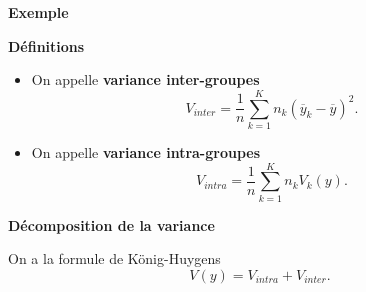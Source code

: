\documentclass[aspectratio=169,xcolor=dvipsnames]{beamer}
\begin{document}
\begin{frame}
\begin{exampleblock}{\textbf{Exemple}}
\begin{figure}
\begin{subfigure}{0.3\textwidth}
		\end{subfigure}
		\end{figure}
	\end{exampleblock}
\end{frame}

\begin{frame}
	
	\begin{block}{\textbf{Définitions}}
\begin{small}
		\begin{itemize}
		\item On appelle \textbf{variance inter-groupes}
			\[
			V_{inter} = \dfrac{1}{n} \sum_{k=1}^K n_k \left( \overline{y}_k - \overline{y}\right)^2.
			\]
		\item On appelle \textbf{variance intra-groupes}
			\[
			V_{intra} = \dfrac{1}{n} \sum_{k=1}^K n_k V_k(y).
			\]
		\end{itemize}
\end{small}
	\end{block}

	\begin{alertblock}{\textbf{Décomposition de la variance}}
\begin{small}
	On a la formule de K\"onig-Huygens
		\[
		V(y) = V_{intra} + V_{inter}.
		\]
\end{small}
	\end{alertblock}
\end{frame}
\end{document}
